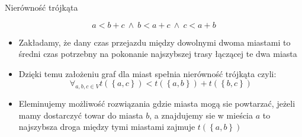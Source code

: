 \begin{frame}{Nierówność trójkąta}
	
	\begin{equation}
		a < b + c \ \wedge \ b < a + c \ \wedge \ c < a + b
	\end{equation}
	\begin{itemize}
		\item Zakładamy, że dany czas przejazdu między dowolnymi dwoma miastami to średni czas potrzebny na pokonanie najszybszej trasy łączącej te dwa miasta
		\item Dzięki temu założeniu graf dla miast spełnia nierówność trójkąta czyli:
			\begin{equation}
				\forall_{a,b,c \in V} t(\left\{a, c\right\}) < t(\left\{a, b\right\}) + t(\left\{b, c\right\})
			\end{equation}
		\item Eleminujemy możliwość rozwiązania gdzie miasta mogą sie powtarzać, jeżeli mamy dostarczyć towar do miasta $b$, a znajdujemy sie w mieścia $a$ to najszybsza droga między tymi miastami zajmuje $t(\left\{a, b\right\})$
	\end{itemize}

\end{frame}
